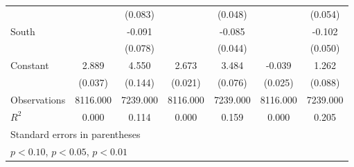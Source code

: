 {\begin{tabular}{l*{6}{c}}
                    &                     &     (0.083)         &                     &     (0.048)         &                     &     (0.054)         \\
\addlinespace
South               &                     &      -0.091         &                     &      -0.085\sym{*}  &                     &      -0.102\sym{**} \\
                    &                     &     (0.078)         &                     &     (0.044)         &                     &     (0.050)         \\
\addlinespace
Constant            &       2.889\sym{***}&       4.550\sym{***}&       2.673\sym{***}&       3.484\sym{***}&      -0.039         &       1.262\sym{***}\\
                    &     (0.037)         &     (0.144)         &     (0.021)         &     (0.076)         &     (0.025)         &     (0.088)         \\
\midrule
Observations        &    8116.000         &    7239.000         &    8116.000         &    7239.000         &    8116.000         &    7239.000         \\
\(R^{2}\)           &       0.000         &       0.114         &       0.000         &       0.159         &       0.000         &       0.205         \\
\bottomrule
\multicolumn{7}{l}{\footnotesize Standard errors in parentheses}\\
\multicolumn{7}{l}{\footnotesize \sym{*} \(p<0.10\), \sym{**} \(p<0.05\), \sym{***} \(p<0.01\)}\\
\end{tabular}
}
